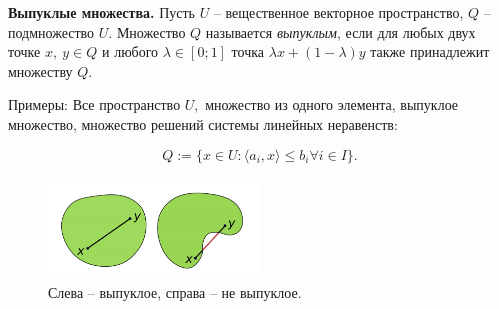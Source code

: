 \textbf{Выпуклые множества.}
Пусть $U$ -- вещественное векторное пространство, $Q$ -- подмножество $U$. Множество $Q$ называется \textit{выпуклым}, если для любых двух точке $x,\ y \in Q$ и любого $\lambda \in [0; 1]$ точка $\lambda x + (1 - \lambda) y$ также принадлежит множеству $Q$.

Примеры: Все пространство $U,$ множество из одного элемента, выпуклое множество, множество решений системы линейных неравенств:

\[Q := \{x\in U : \langle a_i, x\rangle \leq b_i \forall i\in I\}.\]

\begin{figure}[H]
    \centering
    \includegraphics[width=0.5\textwidth]{images/conv_set.png}
    \caption{Слева -- выпуклое, справа -- не выпуклое.}
\end{figure}

